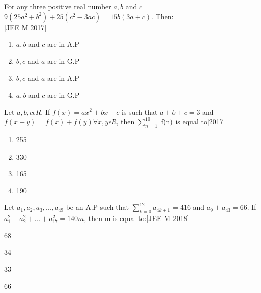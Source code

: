  \item{For any three positive real number $a,b$ and $c$ $9(25a^2+b^2)+ 25(c^2-3ac) = 15b(3a+c)$. Then:\\ \null \hfill{[JEE M 2017]}\begin{multicols}{2}
	 \begin{enumerate}\itemsep.5em
  \item{$a,b$ and $c$ are in A.P}
  \item{$b,c$ and $a$ are in G.P}
  \columnbreak
  \item{$b,c$ and $a$ are in A.P}
  \item{$a,b$ and $c$ are in G.P}
  \end{enumerate}
  \end{multicols}}
  \item{Let $a,b,c\epsilon R$. If $f(x)=ax^2+bx+c$ is such that $a+b+c=3$ and $f(x+y)=f(x)+f(y) \forall x,y \epsilon R$, then $\sum _{n=1}^{10}$  f(n)  is  equal  to\hfill{[2017]}  \begin{multicols}{2}
	 \begin{enumerate}
  \item{255}
  \item{330}
  \columnbreak
  \item{165}
  \item{190}
  \end{enumerate}
  \end{multicols}}
  \item{Let $a_{1},a_{2},a_{3},...,a_{49}$ be an A.P such that $\sum_{k=0}^{12} a_{4k+1}=416$ and $a_{9}+a_{43}=66$. If $a_{1}^2+ a_{2}^{2}+...+a_{17}^{2}=140m$, then m is equal to:\hfill{[JEE M 2018]}\begin{enumerate}
  \begin{multicols}{2
  }\item {68}\item {34}\columnbreak\item{33}  \item{66}
  \end{multicols}
  \end{enumerate}}
